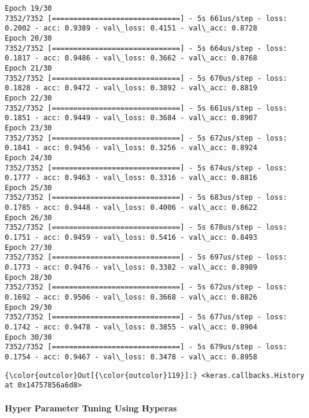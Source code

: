 \documentclass[11pt]{article}
\begin{document}
\begin{Verbatim}[commandchars=\\\{\}]
Epoch 19/30
7352/7352 [==============================] - 5s 661us/step - loss: 0.2002 - acc: 0.9389 - val\_loss: 0.4151 - val\_acc: 0.8728
Epoch 20/30
7352/7352 [==============================] - 5s 664us/step - loss: 0.1817 - acc: 0.9486 - val\_loss: 0.3662 - val\_acc: 0.8768
Epoch 21/30
7352/7352 [==============================] - 5s 670us/step - loss: 0.1828 - acc: 0.9472 - val\_loss: 0.3892 - val\_acc: 0.8819
Epoch 22/30
7352/7352 [==============================] - 5s 661us/step - loss: 0.1851 - acc: 0.9449 - val\_loss: 0.3684 - val\_acc: 0.8907
Epoch 23/30
7352/7352 [==============================] - 5s 672us/step - loss: 0.1841 - acc: 0.9456 - val\_loss: 0.3256 - val\_acc: 0.8924
Epoch 24/30
7352/7352 [==============================] - 5s 674us/step - loss: 0.1777 - acc: 0.9463 - val\_loss: 0.3316 - val\_acc: 0.8816
Epoch 25/30
7352/7352 [==============================] - 5s 683us/step - loss: 0.1785 - acc: 0.9448 - val\_loss: 0.4006 - val\_acc: 0.8622
Epoch 26/30
7352/7352 [==============================] - 5s 678us/step - loss: 0.1751 - acc: 0.9459 - val\_loss: 0.5416 - val\_acc: 0.8493
Epoch 27/30
7352/7352 [==============================] - 5s 697us/step - loss: 0.1773 - acc: 0.9476 - val\_loss: 0.3382 - val\_acc: 0.8989
Epoch 28/30
7352/7352 [==============================] - 5s 672us/step - loss: 0.1692 - acc: 0.9506 - val\_loss: 0.3668 - val\_acc: 0.8826
Epoch 29/30
7352/7352 [==============================] - 5s 677us/step - loss: 0.1742 - acc: 0.9478 - val\_loss: 0.3855 - val\_acc: 0.8904
Epoch 30/30
7352/7352 [==============================] - 5s 679us/step - loss: 0.1754 - acc: 0.9467 - val\_loss: 0.3478 - val\_acc: 0.8958

    \end{Verbatim}

\begin{Verbatim}[commandchars=\\\{\}]
{\color{outcolor}Out[{\color{outcolor}119}]:} <keras.callbacks.History at 0x14757856a6d8>
\end{Verbatim}
            
    \paragraph{Hyper Parameter Tuning Using
Hyperas}\label{hyper-parameter-tuning-using-hyperas}
\end{document}
